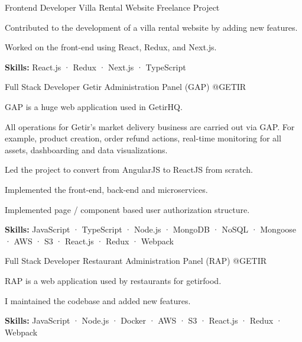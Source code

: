 \begin{cventries}
  \cventry
    {Frontend Developer} %
    {Villa Rental Website} %
    {Freelance Project} %
    {}
    {
      \begin{cvitems} %
        \item {Contributed to the development of a villa rental website by adding new features.}
        \item {Worked on the front-end using React, Redux, and Next.js.}
        \item {\textbf {Skills:} React.js · Redux · Next.js · TypeScript}
      \end{cvitems}
    }

  \cventry
    {Full Stack Developer} %
    {Getir Administration Panel (GAP)} %
    {@GETIR} %
    {}
    {
      \begin{cvitems} %
        \item {GAP is a huge web application used in GetirHQ.}
        \item {All operations for Getir's market delivery business are carried out via GAP. For example, product creation, order refund actions, real-time monitoring for all assets, dashboarding and data visualizations.}
        \item {Led the project to convert from AngularJS to ReactJS from scratch.}
        \item {Implemented the front-end, back-end and microservices.}
        \item {Implemented page / component based user authorization structure.}
        \item {\textbf {Skills:} JavaScript · TypeScript · Node.js · MongoDB · NoSQL · Mongoose · AWS · S3 · React.js · Redux · Webpack}
      \end{cvitems}
    }

  \cventry
    {Full Stack Developer} %
    {Restaurant Administration Panel (RAP)} %
    {@GETIR} %
    {}
    {
      \begin{cvitems} %
        \item {RAP is a web application used by restaurants for getirfood.}
        \item {I maintained the codebase and added new features.}
        \item {\textbf {Skills:} JavaScript · Node.js · Docker · AWS · S3 · React.js · Redux · Webpack}
      \end{cvitems}
    }


\end{cventries}
